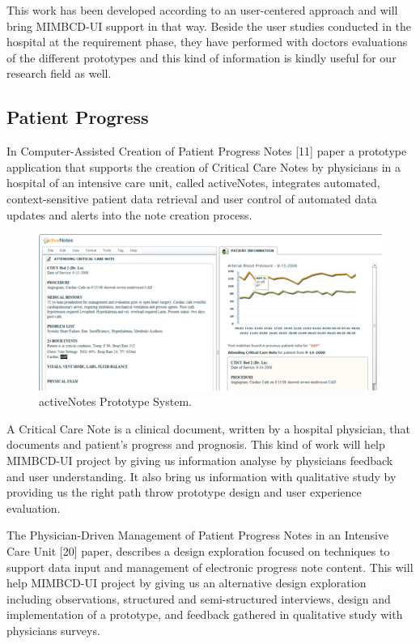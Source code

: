 This work has been developed according to an user-centered approach and will bring MIMBCD-UI support in that way. Beside the user studies conducted in the hospital at the requirement phase, they have performed with doctors evaluations of the different prototypes and this kind of information is kindly useful for our research field as well.

\clearpage

\subsection{Patient Progress}

In Computer-Assisted Creation of Patient Progress Notes [11] paper a prototype application that supports the creation of Critical Care Notes by physicians in a hospital of an intensive care unit, called activeNotes, integrates automated, context-sensitive patient data retrieval and user control of automated data updates and alerts into the note creation process.

\begin{figure}[!hbt]
\centering
\includegraphics[width=1.00\textwidth]{activenotes.png}
\caption{\label{fig:activenotes}activeNotes Prototype System.
}
\end{figure}

A Critical Care Note is a clinical document, written by a hospital physician, that documents and patient's progress and prognosis. This kind of work will help MIMBCD-UI project by giving us information analyse by physicians feedback and user understanding. It also bring us information with qualitative study by providing us the right path throw prototype design and user experience evaluation.

The Physician-Driven Management of Patient Progress Notes in an Intensive Care Unit [20] paper, describes a design exploration focused on techniques to support data input and management of electronic progress note content. This will help MIMBCD-UI project by giving us an alternative design exploration including observations, structured and semi-structured interviews, design and implementation of a prototype, and feedback gathered in qualitative study with physicians surveys.

